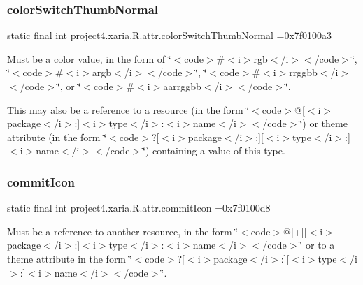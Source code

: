 \subsubsection{\texorpdfstring{color\+Switch\+Thumb\+Normal}{colorSwitchThumbNormal}}
{\footnotesize\ttfamily static final int project4.\+xaria.\+R.\+attr.\+color\+Switch\+Thumb\+Normal =0x7f0100a3\hspace{0.3cm}{\ttfamily [static]}}

Must be a color value, in the form of \char`\"{}$<$code$>$\#$<$i$>$rgb$<$/i$>$$<$/code$>$\char`\"{}, \char`\"{}$<$code$>$\#$<$i$>$argb$<$/i$>$$<$/code$>$\char`\"{}, \char`\"{}$<$code$>$\#$<$i$>$rrggbb$<$/i$>$$<$/code$>$\char`\"{}, or \char`\"{}$<$code$>$\#$<$i$>$aarrggbb$<$/i$>$$<$/code$>$\char`\"{}. 

This may also be a reference to a resource (in the form \char`\"{}$<$code$>$@\mbox{[}$<$i$>$package$<$/i$>$\+:\mbox{]}$<$i$>$type$<$/i$>$\+:$<$i$>$name$<$/i$>$$<$/code$>$\char`\"{}) or theme attribute (in the form \char`\"{}$<$code$>$?\mbox{[}$<$i$>$package$<$/i$>$\+:\mbox{]}\mbox{[}$<$i$>$type$<$/i$>$\+:\mbox{]}$<$i$>$name$<$/i$>$$<$/code$>$\char`\"{}) containing a value of this type. \mbox{\label{classproject4_1_1xaria_1_1R_1_1attr_a6da99bbc7f1c0581475ea4752513ce4e}} 
\subsubsection{\texorpdfstring{commit\+Icon}{commitIcon}}
{\footnotesize\ttfamily static final int project4.\+xaria.\+R.\+attr.\+commit\+Icon =0x7f0100d8\hspace{0.3cm}{\ttfamily [static]}}

Must be a reference to another resource, in the form \char`\"{}$<$code$>$@\mbox{[}+\mbox{]}\mbox{[}$<$i$>$package$<$/i$>$\+:\mbox{]}$<$i$>$type$<$/i$>$\+:$<$i$>$name$<$/i$>$$<$/code$>$\char`\"{} or to a theme attribute in the form \char`\"{}$<$code$>$?\mbox{[}$<$i$>$package$<$/i$>$\+:\mbox{]}\mbox{[}$<$i$>$type$<$/i$>$\+:\mbox{]}$<$i$>$name$<$/i$>$$<$/code$>$\char`\"{}. \mbox{\label{classproject4_1_1xaria_1_1R_1_1attr_aa761e979c4ae0ddd9dff3183b7d581da}} 
